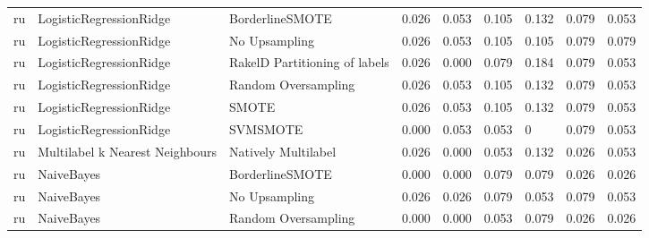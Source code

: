\begin{tabular}{lllllllll}
      ru &         LogisticRegressionRidge &               BorderlineSMOTE &     0.026 &                     0.053 &                 0.105 &                  0.132 &                                   0.079 &     0.053 \\
      ru &         LogisticRegressionRidge &                 No Upsampling &     0.026 &                     0.053 &                 0.105 &                  0.105 &                                   0.079 &     0.079 \\
      ru &         LogisticRegressionRidge & RakelD Partitioning of labels &     0.026 &                     0.000 &                 0.079 &                  0.184 &                                   0.079 &     0.053 \\
      ru &         LogisticRegressionRidge &           Random Oversampling &     0.026 &                     0.053 &                 0.105 &                  0.132 &                                   0.079 &     0.053 \\
      ru &         LogisticRegressionRidge &                         SMOTE &     0.026 &                     0.053 &                 0.105 &                  0.132 &                                   0.079 &     0.053 \\
      ru &         LogisticRegressionRidge &                      SVMSMOTE &     0.000 &                     0.053 &                 0.053 &                      0 &                                   0.079 &     0.053 \\
      ru & Multilabel k Nearest Neighbours &           Natively Multilabel &     0.026 &                     0.000 &                 0.053 &                  0.132 &                                   0.026 &     0.053 \\
      ru &                      NaiveBayes &               BorderlineSMOTE &     0.000 &                     0.000 &                 0.079 &                  0.079 &                                   0.026 &     0.026 \\
      ru &                      NaiveBayes &                 No Upsampling &     0.026 &                     0.026 &                 0.079 &                  0.053 &                                   0.079 &     0.053 \\
      ru &                      NaiveBayes &           Random Oversampling &     0.000 &                     0.000 &                 0.053 &                  0.079 &                                   0.026 &     0.026 \\

\end{tabular}
